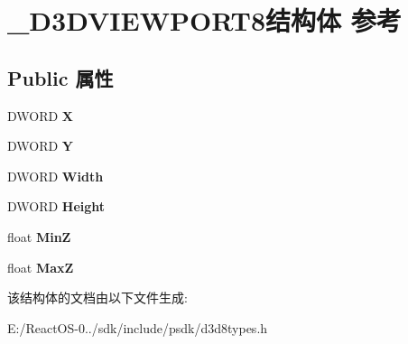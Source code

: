 \hypertarget{struct___d3_d_v_i_e_w_p_o_r_t8}{}\section{\+\_\+\+D3\+D\+V\+I\+E\+W\+P\+O\+R\+T8结构体 参考}
\label{struct___d3_d_v_i_e_w_p_o_r_t8}
\subsection*{Public 属性}
\begin{DoxyCompactItemize}
\item 
\mbox{\label{struct___d3_d_v_i_e_w_p_o_r_t8_a3472e74883e71a8b8eaeb0c155211a78}} 
D\+W\+O\+RD {\bfseries X}
\item 
\mbox{\label{struct___d3_d_v_i_e_w_p_o_r_t8_a21024dd943a6c3835ef5c63f030f07e0}} 
D\+W\+O\+RD {\bfseries Y}
\item 
\mbox{\label{struct___d3_d_v_i_e_w_p_o_r_t8_abe44dc5264add04e225357c00bc28803}} 
D\+W\+O\+RD {\bfseries Width}
\item 
\mbox{\label{struct___d3_d_v_i_e_w_p_o_r_t8_a496c8c54eff452cd652e1643c07a2492}} 
D\+W\+O\+RD {\bfseries Height}
\item 
\mbox{\label{struct___d3_d_v_i_e_w_p_o_r_t8_a07d5a133b8205c7f74ca94ded57b4721}} 
float {\bfseries MinZ}
\item 
\mbox{\label{struct___d3_d_v_i_e_w_p_o_r_t8_a4e1ee0e1d639d3001c81378651f10011}} 
float {\bfseries MaxZ}
\end{DoxyCompactItemize}


该结构体的文档由以下文件生成\+:\begin{DoxyCompactItemize}
\item 
E\+:/\+React\+O\+S-\/0../sdk/include/psdk/d3d8types.\+h\end{DoxyCompactItemize}

